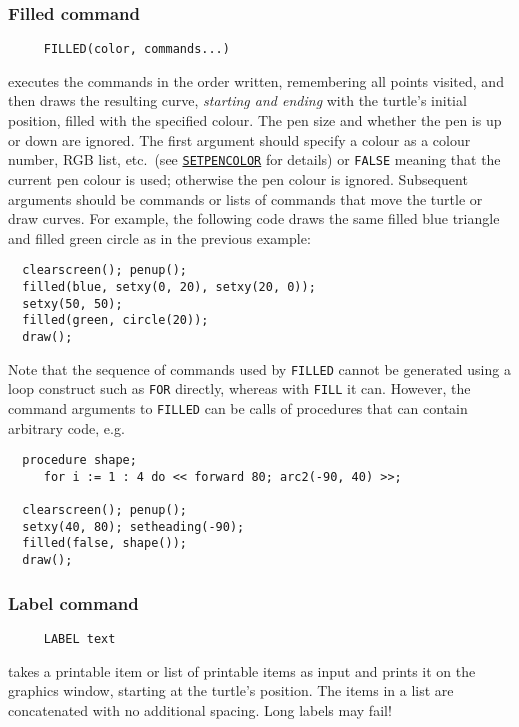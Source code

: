 \subsubsection*{Filled command}
\begin{verbatim}
     FILLED(color, commands...)
\end{verbatim}
executes the commands in the order written, remembering all points
visited, and then draws the resulting curve, \emph{starting and
ending} with the turtle's initial position, filled with the specified
colour.  The pen size and whether the pen is up or down are ignored.
The first argument should specify a colour as a colour number, RGB
list, etc.\ (see
\hyperref[logoturtle:setpencolor]{\texttt{SETPENCOLOR}} for details)
or \texttt{FALSE} meaning that the current pen colour is used;
otherwise the pen colour is ignored.  Subsequent arguments should be
commands or lists of commands that move the turtle or draw curves.
For example, the following code draws the same filled blue triangle
and filled green circle as in the previous example:
\begin{verbatim}
  clearscreen(); penup();
  filled(blue, setxy(0, 20), setxy(20, 0));
  setxy(50, 50);
  filled(green, circle(20));
  draw();
\end{verbatim}
Note that the sequence of commands used by \texttt{FILLED} cannot be
generated using a loop construct such as \texttt{FOR} directly,
whereas with \texttt{FILL} it can.  However, the command arguments to
\texttt{FILLED} can be calls of procedures that can contain arbitrary
code, e.g.
\begin{verbatim}
  procedure shape;
     for i := 1 : 4 do << forward 80; arc2(-90, 40) >>;

  clearscreen(); penup();
  setxy(40, 80); setheading(-90);
  filled(false, shape());
  draw();
\end{verbatim}

\subsubsection*{Label command}
\begin{verbatim}
     LABEL text
\end{verbatim}
takes a printable item or list of printable items as input and prints
it on the graphics window, starting at the turtle's position.  The
items in a list are concatenated with no additional spacing.  Long
labels may fail!

